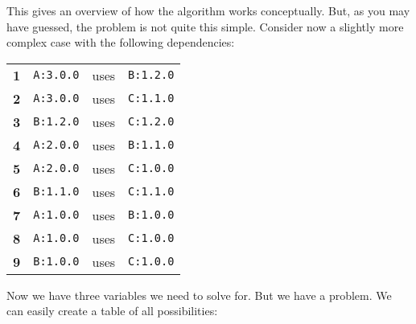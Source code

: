 \documentclass[11pt,a4paper,twocolumn]{article}
\renewcommand{\small}{\fontsize{9.5pt}{11.1pt}\selectfont}
\newcommand{\code}[1]{\texttt{#1}} %
\begin{document}
This gives an overview of how the algorithm works conceptually.  But,
as you may have guessed, the problem is not quite this simple.
Consider now a slightly more complex case with the following
dependencies:
{\small
\begin{center}
\begin{tabular}{llcl}
  \textbf{1} &\code{A:3.0.0} &uses &\code{B:1.2.0} \\
  \textbf{2} &\code{A:3.0.0} &uses &\code{C:1.1.0}\\
  \textbf{3} &\code{B:1.2.0} &uses &\code{C:1.2.0}\\
  \textbf{4} &\code{A:2.0.0} &uses &\code{B:1.1.0}\\
  \textbf{5} &\code{A:2.0.0} &uses &\code{C:1.0.0}\\
  \textbf{6} &\code{B:1.1.0} &uses &\code{C:1.1.0}\\
  \textbf{7} &\code{A:1.0.0} &uses &\code{B:1.0.0}\\
  \textbf{8} &\code{A:1.0.0} &uses &\code{C:1.0.0}\\
  \textbf{9} &\code{B:1.0.0} &uses &\code{C:1.0.0}
\end{tabular}
\end{center}
}
Now we have three variables we need to solve for.  But we have a
problem.  We can easily create a table of all possibilities:
\end{document}
